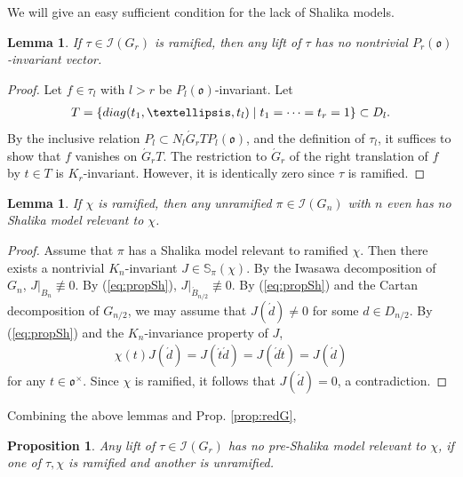 \documentclass[11pt]{amsart}
\newcommand\oo{\mathfrak{o}}
\newcommand\Sb{{\mathbb{S}}}
\newcommand\1{\mathbf{1}}
\newcommand\diag{{\rm diag}}
\newcommand\nid{\noindent}
\newcommand\ac{\acute}
\newcommand\tm{\times}
\newcommand\Ir{{\mathscr{I}}}
\numberwithin{equation}{section}
\newtheorem{prop}[thm]{Proposition}
\newtheorem{lem}[thm]{Lemma}
\begin{document}
\nid
We will give an easy sufficient condition for the lack of Shalika models.
\begin{lem}\label{lem:notauram}
If $\tau \in \Ir(G_r)$ is ramified, then any lift of $\tau$ has no nontrivial $P_{r}(\oo)$-invariant vector.
\end{lem}
\begin{proof}
Let $f \in \tau_l$ with $l > r$ be $P_{l}(\oo)$-invariant.
Let 
\begin{align*}
T = \{\diag(t_1, \ldots, t_l) \mid t_{1} = \cdots = t_{r} = 1 \} \subset D_l.
\end{align*}
By the inclusive relation $P_l \subset N_l \ac{G}_r T  P_{l}(\oo)$, and the definition of $\tau_l$, it suffices to show that $f$ vanishes on $\ac{G}_r T$.
The restriction to $\ac{G}_r$ of the right translation of $f$ by $t \in T$ is $K_r$-invariant.
However, it is identically zero since $\tau$ is ramified.
\end{proof}
\begin{lem}\label{lem:unrnoS}
If $\chi$ is ramified, then any unramified $\pi \in \Ir(G_{n})$ with $n$ even has no Shalika model relevant to $\chi$.
\end{lem}
\begin{proof}
Assume that $\pi$ has a Shalika model relevant to ramified $\chi$.
Then there exists a nontrivial $K_{n}$-invariant $J \in \Sb_\pi(\chi)$.
By the Iwasawa decomposition of $G_{n}$, $J|_{B_{n}} \not\equiv 0$.
By (\ref{eq:propSh}), $J|_{\ac{B}_{n/2}} \not\equiv 0$.
By (\ref{eq:propSh}) and the Cartan decomposition of $G_{n/2}$, we may assume that $J(\ac{d}) \neq 0$ for some $d \in D_{n/2}$.
By (\ref{eq:propSh}) and the $K_{n}$-invariance property of $J$,  
\begin{align*}
\chi(t) J(\ac{d}) = J(\ac{t} \ac{d}) =  J(\ac{d} \ac{t}) =  J(\ac{d})
\end{align*} 
for any $t \in \oo^\tm$.
Since $\chi$ is ramified, it follows that $J(\ac{d}) = 0$, a contradiction.
\end{proof}
\nid
Combining the above lemmas and Prop. \ref{prop:redG}, 
\begin{prop}\label{prop:genPSur}
Any lift of $\tau \in \Ir(G_{r})$ has no pre-Shalika model relevant to $\chi$, if one of $\tau, \chi$ is ramified and another is unramified.
\end{prop}
\end{document}
